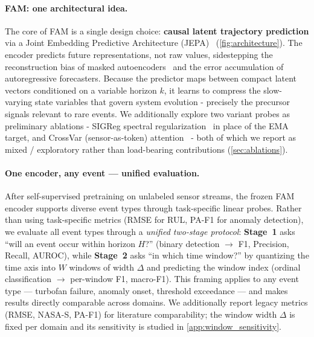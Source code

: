 \documentclass{article}
\begin{document}
\paragraph{FAM: one architectural idea.} The core of FAM is a single design choice: \textbf{causal latent trajectory prediction} via a Joint Embedding Predictive Architecture (JEPA)~\citep{assran2023ijepa} (\cref{fig:architecture}). The encoder predicts future representations, not raw values, sidestepping the reconstruction bias of masked autoencoders~\citep{he2022mae} and the error accumulation of autoregressive forecasters. Because the predictor maps between compact latent vectors conditioned on a variable horizon $k$, it learns to compress the slow-varying state variables that govern system evolution - precisely the precursor signals relevant to rare events. We additionally explore two variant probes as preliminary ablations - SIGReg spectral regularization~\citep{balestriero2025lejepa} in place of the EMA target, and CrossVar (sensor-as-token) attention~\citep{liu2024itransformer} - both of which we report as mixed / exploratory rather than load-bearing contributions (\cref{sec:ablations}).

\paragraph{One encoder, any event — unified evaluation.} After self-supervised pretraining on unlabeled sensor streams, the frozen FAM encoder supports diverse event types through task-specific linear probes. Rather than using task-specific metrics (RMSE for RUL, PA-F1 for anomaly detection), we evaluate all event types through a \emph{unified two-stage protocol}: \textbf{Stage~1} asks ``will an event occur within horizon $H$?'' (binary detection $\to$ F1, Precision, Recall, AUROC), while \textbf{Stage~2} asks ``in which time window?'' by quantizing the time axis into $W$ windows of width $\Delta$ and predicting the window index (ordinal classification $\to$ per-window F1, macro-F1). This framing applies to any event type --- turbofan failure, anomaly onset, threshold exceedance --- and makes results directly comparable across domains. We additionally report legacy metrics (RMSE, NASA-S, PA-F1) for literature comparability; the window width $\Delta$ is fixed per domain and its sensitivity is studied in \cref{app:window_sensitivity}.
\end{document}
